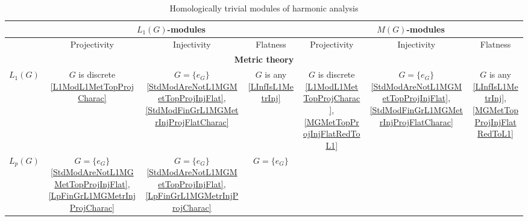 \documentclass{article}
\theoremstyle{plain}
\theoremstyle{definition}
\begin{document}
\begin{fulltext}
\begin{table}[ht]
    \centering
    \caption{Homologically trivial modules of harmonic analysis}
    \begin{tiny}
        \begin{tabular}{|c|c|c|c|c|c|c|}
        \hline
             & 
             \multicolumn{3}{c|}{$L_1(G)$-modules} & 
             \multicolumn{3}{c|}{$M(G)$-modules} \\
        \hline
             & 
             Projectivity & 
             Injectivity & 
             Flatness & 
             Projectivity & 
             Injectivity & 
             Flatness \\
        \hline
             \multicolumn{7}{c}{\textbf{Metric theory}} \\
        \hline
            $L_1(G)$ & 
            \shortstack{
                $G$ is discrete \\ 
               {\ref{L1ModL1MetTopProjCharac}}
            } & 
            \shortstack{
                $G=\{e_G\}$ \\ 
               {\ref{StdModAreNotL1MGMetTopProjInjFlat}}, 
               {\ref{StdModFinGrL1MGMetrInjProjFlatCharac}}
            } &
            \shortstack{
                $G$ is any \\ 
               {\ref{LInfIsL1MetrInj}}
            } &
            \shortstack{
                $G$ is discrete \\ 
               {\ref{L1ModL1MetTopProjCharac}},
               {\ref{MGMetTopProjInjFlatRedToL1}}
            } &
            \shortstack{
                $G=\{e_G\}$ \\
               {\ref{StdModAreNotL1MGMetTopProjInjFlat}},
               {\ref{StdModFinGrL1MGMetrInjProjFlatCharac}}
            } & 
            \shortstack{
                $G$ is any \\
               {\ref{LInfIsL1MetrInj}},
               {\ref{MGMetTopProjInjFlatRedToL1}}
            } \\
        \hline
             $L_p(G)$ & 
             \shortstack{
                $G=\{e_G\}$ \\ 
               {\ref{StdModAreNotL1MGMetTopProjInjFlat}},
               {\ref{LpFinGrL1MGMetrInjProjCharac}}
            } &
            \shortstack{
                $G=\{e_G\}$ \\ 
               {\ref{StdModAreNotL1MGMetTopProjInjFlat}},
               {\ref{LpFinGrL1MGMetrInjProjCharac}}
            } & 
            \shortstack{
                $G=\{e_G\}$ \\
}
\end{tabular}
\end{tiny}
\end{table}
\end{fulltext}
\end{document}
